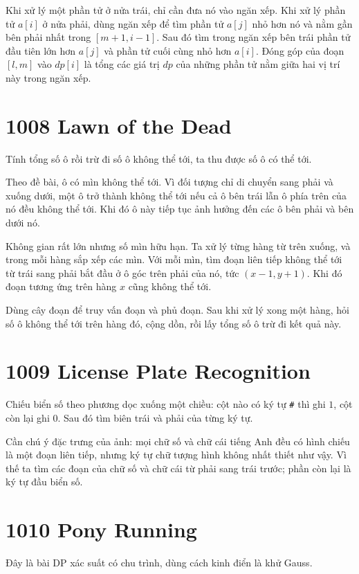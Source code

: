 \documentclass[11pt]{article}
\begin{document}
Khi xử lý một phần tử ở nửa trái, chỉ cần đưa nó vào ngăn xếp. Khi xử lý
phần tử $a[i]$ ở nửa phải, dùng ngăn xếp để tìm phần tử $a[j]$ nhỏ hơn nó và
nằm gần bên phải nhất trong $[m+1,i-1]$. Sau đó tìm trong ngăn xếp bên trái
phần tử đầu tiên lớn hơn $a[j]$ và phần tử cuối cùng nhỏ hơn $a[i]$. Đóng góp
của đoạn $[l,m]$ vào $dp[i]$ là tổng các giá trị $dp$ của những phần tử nằm
giữa hai vị trí này trong ngăn xếp.

\section{1008 Lawn of the Dead}

Tính tổng số ô rồi trừ đi số ô không thể tới, ta thu được số ô có thể tới.

Theo đề bài, ô có mìn không thể tới. Vì đối tượng chỉ di chuyển sang phải và
xuống dưới, một ô trở thành không thể tới nếu cả ô bên trái lẫn ô phía trên
của nó đều không thể tới. Khi đó ô này tiếp tục ảnh hưởng đến các ô bên phải
và bên dưới nó.

Không gian rất lớn nhưng số mìn hữu hạn. Ta xử lý từng hàng từ trên xuống,
và trong mỗi hàng sắp xếp các mìn. Với mỗi mìn, tìm đoạn liên tiếp không thể
tới từ trái sang phải bắt đầu ở ô góc trên phải của nó, tức $(x-1,y+1)$. Khi
đó đoạn tương ứng trên hàng $x$ cũng không thể tới.

Dùng cây đoạn để truy vấn đoạn và phủ đoạn. Sau khi xử lý xong một hàng, hỏi
số ô không thể tới trên hàng đó, cộng dồn, rồi lấy tổng số ô trừ đi kết quả
này.

\section{1009 License Plate Recognition}

Chiếu biển số theo phương dọc xuống một chiều: cột nào có ký tự \texttt{\#}
thì ghi $1$, cột còn lại ghi $0$. Sau đó tìm biên trái và phải của từng ký
tự.

Cần chú ý đặc trưng của ảnh: mọi chữ số và chữ cái tiếng Anh đều có hình
chiếu là một đoạn liên tiếp, nhưng ký tự chữ tượng hình không nhất thiết như
vậy. Vì thế ta tìm các đoạn của chữ số và chữ cái từ phải sang trái trước;
phần còn lại là ký tự đầu biển số.

\section{1010 Pony Running}

Đây là bài DP xác suất có chu trình, dùng cách kinh điển là khử Gauss.
\end{document}
